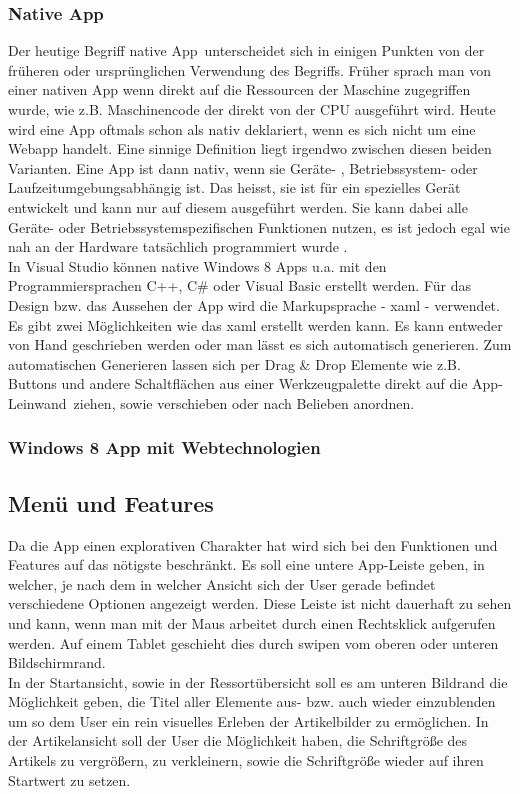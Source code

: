 \documentclass[12pt,a4paper,bibtotoc]{scrartcl}
\begin{document}
\subsubsection{Native App}
\label{subsubsec:nativ}
Der heutige Begriff \glqq native App\grqq\ unterscheidet sich in einigen Punkten von der früheren oder ursprünglichen Verwendung des Begriffs. Früher sprach man von einer nativen App wenn direkt auf die Ressourcen der  Maschine zugegriffen wurde, wie z.B. Maschinencode der direkt von der CPU ausgeführt wird. Heute wird eine App oftmals schon als nativ deklariert, wenn es sich nicht um eine Webapp handelt. Eine sinnige Definition liegt irgendwo zwischen diesen beiden Varianten. Eine App ist dann nativ, wenn sie Geräte- , Betriebssystem- oder Laufzeitumgebungsabhängig ist. Das heisst, sie ist für ein spezielles Gerät entwickelt und kann nur auf diesem ausgeführt werden. Sie kann dabei alle Geräte- oder Betriebssystemspezifischen Funktionen nutzen, es ist jedoch egal wie nah an der Hardware tatsächlich programmiert wurde \citep{OBrian2013}.\\
In Visual Studio können native Windows 8  Apps u.a. mit den Programmiersprachen C++, C\# oder Visual Basic erstellt werden. Für das Design bzw. das Aussehen der App wird die Markupsprache - \ac{xaml} - verwendet. Es gibt zwei Möglichkeiten wie das \ac{xaml} erstellt werden kann. Es kann entweder von Hand geschrieben werden oder man lässt es sich automatisch generieren. Zum automatischen Generieren lassen sich per Drag \& Drop Elemente wie z.B. Buttons und andere Schaltflächen aus einer Werkzeugpalette direkt auf die \glqq App-Leinwand\grqq\ ziehen, sowie verschieben oder nach Belieben anordnen.

\subsubsection{Windows 8 App mit Webtechnologien}
\label{subsubsec:webwin8}

  


\subsection{Menü und Features}
\label{subsec:menuandproperties}
Da die App einen explorativen Charakter hat wird sich bei den Funktionen und Features auf das nötigste beschränkt. Es soll eine untere App-Leiste geben, in welcher, je nach dem in welcher Ansicht sich der User gerade befindet verschiedene Optionen angezeigt werden. Diese Leiste ist nicht dauerhaft zu sehen und kann, wenn man mit der Maus arbeitet durch einen Rechtsklick aufgerufen werden. Auf einem Tablet geschieht dies durch swipen vom oberen oder unteren Bildschirmrand.\\
In der Startansicht, sowie in der Ressortübersicht soll es am unteren Bildrand die Möglichkeit geben, die Titel aller Elemente aus- bzw. auch wieder einzublenden um so dem User ein rein visuelles Erleben der Artikelbilder zu ermöglichen. In der Artikelansicht soll der User die Möglichkeit haben, die Schriftgröße des Artikels zu vergrößern, zu verkleinern, sowie die Schriftgröße wieder auf ihren Startwert zu setzen. 
\end{document}
